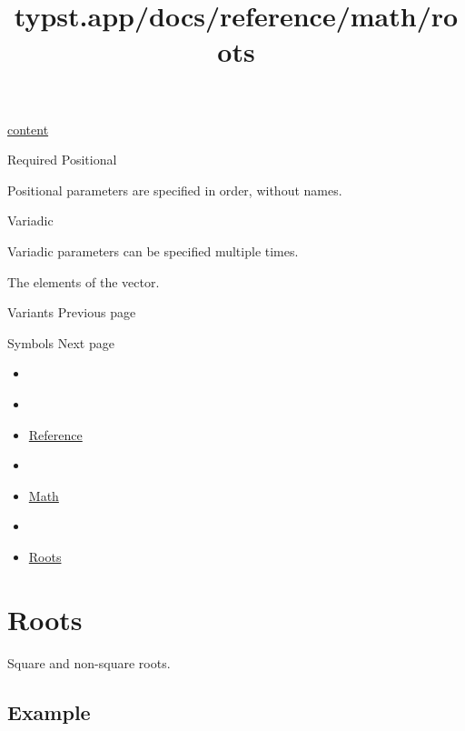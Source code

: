 \href{/docs/reference/foundations/content/}{content}

{Required} {{ Positional }}

\label{parameters-children-positional-tooltip}
Positional parameters are specified in order, without names.

{{ Variadic }}

\label{parameters-children-variadic-tooltip}
Variadic parameters can be specified multiple times.

The elements of the vector.

\href{/docs/reference/math/variants/}{\pandocbounded{}}

{ Variants } { Previous page }

\href{/docs/reference/symbols/}{\pandocbounded{}}

{ Symbols } { Next page }


\title{typst.app/docs/reference/math/roots}

\begin{itemize}
\tightlist
\item
  \href{/docs}{}
\item
  
\item
  \href{/docs/reference/}{Reference}
\item
  
\item
  \href{/docs/reference/math/}{Math}
\item
  
\item
  \href{/docs/reference/math/roots}{Roots}
\end{itemize}

\section{Roots}\label{summary}

Square and non-square roots.

\subsection{Example}\label{example}

